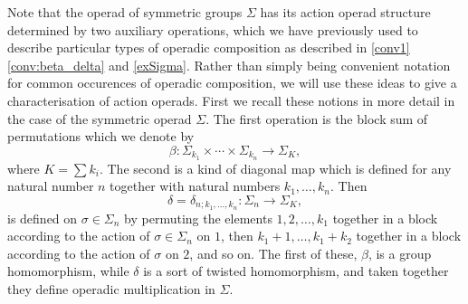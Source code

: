 Note that the operad of symmetric groups $\Sigma$ has its action operad structure determined by two auxiliary operations, which we have previously used to describe particular types of operadic composition as described in \cref{conv1} \eqref{conv:beta_delta} and \cref{exSigma}. Rather than simply being convenient notation for common occurences of operadic composition, we will use these ideas to give a characterisation of action operads. First we recall these notions in more detail in the case of the symmetric operad $\Sigma$. The first operation is the block sum of permutations which we denote by
  \[
    \beta \colon \Sigma_{k_{1}} \times \cdots \times \Sigma_{k_{n}} \rightarrow \Sigma_{K},
  \]
where $K = \sum k_{i}$. The second is a kind of diagonal map which is defined for any natural number $n$ together with natural numbers $k_{1}, \ldots, k_{n}$. Then
  \[
    \delta = \delta_{n; k_{1}, \ldots, k_{n}} \colon \Sigma_{n} \rightarrow \Sigma_{K},
  \]
is defined on $\sigma \in \Sigma_{n}$ by permuting the elements $1, 2, \ldots, k_{1}$ together in a block according to the action of $\sigma \in \Sigma_{n}$ on $1$, then $k_{1}+1, \ldots, k_{1}+k_{2}$ together in a block according to the action of $\sigma$ on $2$, and so on. The first of these, $\beta$, is a group homomorphism, while $\delta$ is a sort of twisted homomorphism, and taken together they define operadic multiplication in $\Sigma$.




